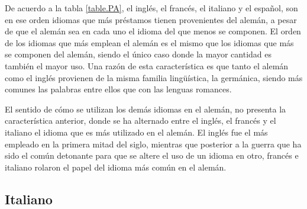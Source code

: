De acuerdo a la tabla \ref{table.PA},  el inglés, el francés, el italiano y el español, son en ese orden idiomas que más préstamos tienen provenientes del alemán, a pesar de que el alemán sea en cada uno el idioma del que menos se componen.  El orden de los idiomas que más emplean el alemán es el mismo que los idiomas que más se componen del alemán, siendo el único caso donde la mayor cantidad es también el mayor uso. Una razón de esta característica es que tanto el alemán como el inglés provienen de la misma familia lingüística, la germánica,  siendo más comunes las palabras entre ellos  que con las lenguas romances.

El sentido de cómo se utilizan los demás idiomas en el alemán, no presenta la característica anterior,   donde se ha alternado entre el inglés, el francés y el italiano el idioma que es más utilizado en el alemán.  El inglés fue el más empleado en la primera mitad del siglo, mientras que posterior a la guerra que ha sido el común detonante para que se altere el uso de un idioma en otro,  francés e italiano rolaron el papel del idioma más común en el alemán. 


\newpage
\subsection{Italiano}

